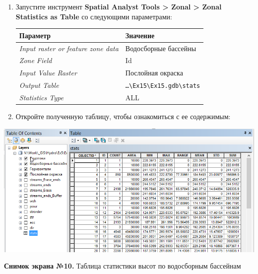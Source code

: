 \documentclass[]{book}
\theoremstyle{definition}
\theoremstyle{definition}
\theoremstyle{definition}
\theoremstyle{remark}
\begin{document}
\begin{enumerate}
\def\labelenumi{\arabic{enumi}.}
\item
  Запустите инструмент \textbf{Spatial Analyst Tools \textgreater{}
  Zonal \textgreater{} Zonal Statistics as Table} со следующими
  параметрами:

  \begin{longtable}[]{@{}ll@{}}
  \toprule
  Параметр & Значение\tabularnewline
  \midrule
  \endhead
  \emph{Input raster or feature zone data} & Водосборные
  бассейны\tabularnewline
  \emph{Zone Field} & Id\tabularnewline
  \emph{Input Value Raster} & Послойная окраска\tabularnewline
  \emph{Output Table} &
  \texttt{\ldots{}\textbackslash{}Ex15\textbackslash{}Ex15.gdb\textbackslash{}stats}\tabularnewline
  \emph{Statistics Type} & ALL\tabularnewline
  \bottomrule
  \end{longtable}
\item
  Откройте полученную таблицу, чтобы ознакомиться с ее содержимым:
\end{enumerate}

\includegraphics{images/Ex15/image26.png}

\textbf{Снимок экрана №10.} Таблица статистики высот по водосборным
бассейнам
\end{document}
